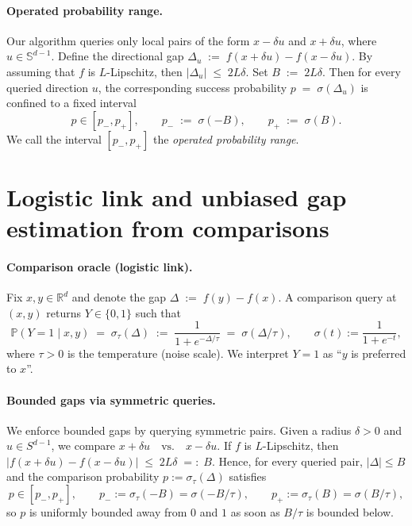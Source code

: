 \documentclass[11pt]{article}
\theoremstyle{plain}
\theoremstyle{remark}
\newcommand{\R}{\mathbb{R}}
\newcommand{\Prob}{\mathbb{P}}
\newcommand{\1}{\mathbf{1}}
\begin{document}
\paragraph{Operated probability range.}
Our algorithm queries only local pairs of the form $x-\delta u$ and $x+\delta u$, where
$u\in \mathbb S^{d-1}$. Define the directional gap
$
\Delta_u \;:=\; f(x+\delta u)-f(x-\delta u).
$
By assuming that $f$ is $L$-Lipschitz, then
$
|\Delta_u| \;\le\; 2L\delta.$
Set
$
B \;:=\; 2L\delta.
$
Then for every queried direction $u$, the corresponding success probability
$
p \;=\; \sigma(\Delta_u)
$
is confined to a fixed interval
\[
p \in [p_-,p_+],
\qquad
p_- \;:=\; \sigma(-B),
\qquad
p_+ \;:=\; \sigma(B).
\]
We call the interval $[p_-,p_+]$ the \emph{operated probability range}.






































\section{Logistic link and unbiased gap estimation from comparisons}
\label{sec:logistic_rr}

\paragraph{Comparison oracle (logistic link).}
Fix $x,y\in\R^d$ and denote the gap
$\Delta \;:=\; f(y)-f(x).$
A comparison query at $(x,y)$ returns $Y\in\{0,1\}$ such that
\[
\Prob(Y=1\mid x,y)
\;=\;
\sigma_\tau(\Delta)
\;:=\;
\frac{1}{1+e^{-\Delta/\tau}}
\;=\;
\sigma(\Delta/\tau),
\qquad
\sigma(t):=\frac{1}{1+e^{-t}},
\]
where $\tau>0$ is the temperature (noise scale). We interpret $Y=1$ as ``$y$ is preferred to $x$''.

\paragraph{Bounded gaps via symmetric queries.}
We enforce bounded gaps by querying symmetric pairs. Given a radius $\delta>0$ and $u\in S^{d-1}$, we compare
$
x+\delta u \quad \text{vs.} \quad x-\delta u.
$
If $f$ is $L$-Lipschitz, then
$
\big|f(x+\delta u)-f(x-\delta u)\big|
\;\le\;
2L\delta
\;=:\;
B.
$
Hence, for every queried pair, $|\Delta|\le B$ and the comparison probability
$p:=\sigma_\tau(\Delta)$ satisfies
\[
p\in[p_-,p_+],
\qquad
p_-:=\sigma_\tau(-B)=\sigma(-B/\tau),
\qquad
p_+:=\sigma_\tau(B)=\sigma(B/\tau),
\]
so $p$ is uniformly bounded away from $0$ and $1$ as soon as $B/\tau$ is bounded below.
\end{document}
